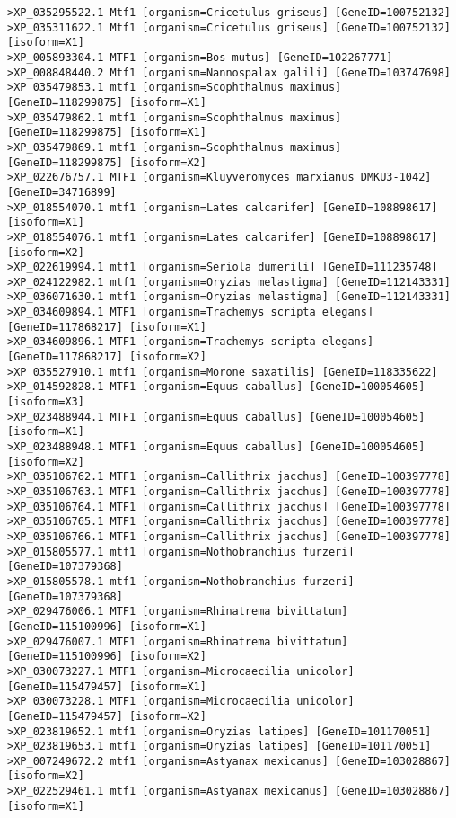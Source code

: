 \begin{lstlisting}[basicstyle=\tiny\ttfamily]
>XP_035295522.1 Mtf1 [organism=Cricetulus griseus] [GeneID=100752132]
>XP_035311622.1 Mtf1 [organism=Cricetulus griseus] [GeneID=100752132] [isoform=X1]
>XP_005893304.1 MTF1 [organism=Bos mutus] [GeneID=102267771]
>XP_008848440.2 Mtf1 [organism=Nannospalax galili] [GeneID=103747698]
>XP_035479853.1 mtf1 [organism=Scophthalmus maximus] [GeneID=118299875] [isoform=X1]
>XP_035479862.1 mtf1 [organism=Scophthalmus maximus] [GeneID=118299875] [isoform=X1]
>XP_035479869.1 mtf1 [organism=Scophthalmus maximus] [GeneID=118299875] [isoform=X2]
>XP_022676757.1 MTF1 [organism=Kluyveromyces marxianus DMKU3-1042] [GeneID=34716899]
>XP_018554070.1 mtf1 [organism=Lates calcarifer] [GeneID=108898617] [isoform=X1]
>XP_018554076.1 mtf1 [organism=Lates calcarifer] [GeneID=108898617] [isoform=X2]
>XP_022619994.1 mtf1 [organism=Seriola dumerili] [GeneID=111235748]
>XP_024122982.1 mtf1 [organism=Oryzias melastigma] [GeneID=112143331]
>XP_036071630.1 mtf1 [organism=Oryzias melastigma] [GeneID=112143331]
>XP_034609894.1 MTF1 [organism=Trachemys scripta elegans] [GeneID=117868217] [isoform=X1]
>XP_034609896.1 MTF1 [organism=Trachemys scripta elegans] [GeneID=117868217] [isoform=X2]
>XP_035527910.1 mtf1 [organism=Morone saxatilis] [GeneID=118335622]
>XP_014592828.1 MTF1 [organism=Equus caballus] [GeneID=100054605] [isoform=X3]
>XP_023488944.1 MTF1 [organism=Equus caballus] [GeneID=100054605] [isoform=X1]
>XP_023488948.1 MTF1 [organism=Equus caballus] [GeneID=100054605] [isoform=X2]
>XP_035106762.1 MTF1 [organism=Callithrix jacchus] [GeneID=100397778]
>XP_035106763.1 MTF1 [organism=Callithrix jacchus] [GeneID=100397778]
>XP_035106764.1 MTF1 [organism=Callithrix jacchus] [GeneID=100397778]
>XP_035106765.1 MTF1 [organism=Callithrix jacchus] [GeneID=100397778]
>XP_035106766.1 MTF1 [organism=Callithrix jacchus] [GeneID=100397778]
>XP_015805577.1 mtf1 [organism=Nothobranchius furzeri] [GeneID=107379368]
>XP_015805578.1 mtf1 [organism=Nothobranchius furzeri] [GeneID=107379368]
>XP_029476006.1 MTF1 [organism=Rhinatrema bivittatum] [GeneID=115100996] [isoform=X1]
>XP_029476007.1 MTF1 [organism=Rhinatrema bivittatum] [GeneID=115100996] [isoform=X2]
>XP_030073227.1 MTF1 [organism=Microcaecilia unicolor] [GeneID=115479457] [isoform=X1]
>XP_030073228.1 MTF1 [organism=Microcaecilia unicolor] [GeneID=115479457] [isoform=X2]
>XP_023819652.1 mtf1 [organism=Oryzias latipes] [GeneID=101170051]
>XP_023819653.1 mtf1 [organism=Oryzias latipes] [GeneID=101170051]
>XP_007249672.2 mtf1 [organism=Astyanax mexicanus] [GeneID=103028867] [isoform=X2]
>XP_022529461.1 mtf1 [organism=Astyanax mexicanus] [GeneID=103028867] [isoform=X1]

\end{lstlisting}
